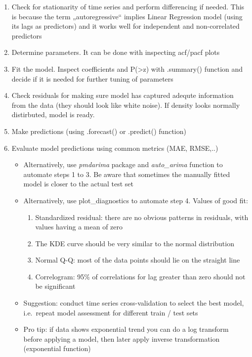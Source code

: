 \documentclass[
  letterpaper,
]{book}
\providecommand{\tightlist}{%
  \setlength{\itemsep}{0pt}\setlength{\parskip}{0pt}}\usepackage{longtable,booktabs,array}
\begin{document}
\begin{itemize}
  \begin{enumerate}
  \def\labelenumi{\arabic{enumi})}
  \item
    Check for stationarity of time series and perform differencing if
    needed. This is because the term „autoregressive`` implies Linear
    Regression model (using its lags as predictors) and it works well
    for independent and non-correlated predictors
  \item
    Determine parameters. It can be done with inspecting acf/pacf plots
  \item
    Fit the model. Inspect coefficients and
    P(\textgreater\textbar z\textbar) with .summary() function and
    decide if it is needed for further tuning of parameters
  \item
    Check residuals for making sure model has captured adequte
    information from the data (they should look like white noise). If
    density looks normally distirbuted, model is ready.
  \item
    Make predictions (using .forecast() or .predict() function)
  \item
    Evaluate model predictions using common metrics (MAE, RMSE,..)

    \begin{itemize}
    \tightlist
    \item
      Alternatively, use \emph{pmdarima} package and \emph{auto\_arima}
      function to automate steps 1 to 3. Be aware that sometimes the
      manually fitted model is closer to the actual test set
    \item
      Alternatively, use plot\_diagnostics to automate step 4. Values of
      good fit:

      \begin{enumerate}
      \def\labelenumii{\alph{enumii}.}
      \tightlist
      \item
        Standardized residual: there are no obvious patterns in
        residuals, with values having a mean of zero
      \item
        The KDE curve should be very similar to the normal distribution
      \item
        Normal Q-Q: most of the data points should lie on the straight
        line
      \item
        Correlogram: 95\% of correlations for lag greater than zero
        should not be significant
      \end{enumerate}
    \item
      Suggestion: conduct time series cross-validation to select the
      best model, i.e.~repeat model assessment for different train /
      test sets
    \item
      Pro tip: if data shows exponential trend you can do a log
      transform before applying a model, then later apply inverse
      transformation (exponential function)
    \end{itemize}
  \end{enumerate}
\end{itemize}
\end{document}
